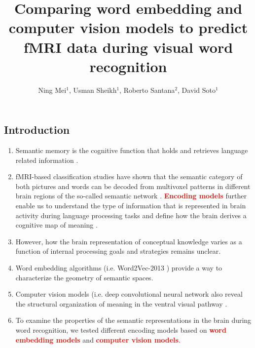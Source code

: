 \documentclass{sciposter}
\title{\myfont Comparing word embedding and computer vision models to predict fMRI data during visual word recognition}
\author{Ning Mei$^1$, Usman Sheikh$^1$, Roberto Santana$^2$, David Soto$^1$}
\institute{1. Basque Center on Cognition, Brain, and Language, San Sebastian, Spain\\ 2. University of Basque Country, Spain}
\begin{document}

\maketitle

\newcommand{\mycaption}{%
\ifx \@captype \@undefined \@latex@error {\noexpand \caption outside float}\@ehd \expandafter \@gobble \else \refstepcounter \@captype \expandafter \@firstofone \fi {\@dblarg {\@caption \@captype }}%
}%

\begin{multicols}{3}


\section{Introduction}

\begin{enumerate}
    \large
    \item Semantic memory is the cognitive function that holds and retrieves language related information \cite{binder2009a}.
    \item fMRI-based classification studies \cite{bauerneural} have shown that the semantic category of both pictures and words can be decoded from multivoxel patterns in different brain regions of the so-called semantic network \cite{binder2009a}. \textcolor{red}{\textbf{Encoding models}} further enable us to understand the type of information that is represented in brain activity during language processing tasks and define how the brain derives a cognitive map of meaning \cite{naselaris2011a,felsen2006a}.
    \item However, how the brain representation of conceptual knowledge varies as a function of internal processing goals and strategies remains unclear.
    \item Word embedding algorithms (i.e. Word2Vec-2013 \cite{mikolov2013a}) provide a way to characterize the geometry of semantic spaces. 
    \item Computer vision models (i.e. deep convolutional neural network \cite{lecun1998gradient} also reveal the structural organization of meaning in the ventral visual pathway \cite{simonyan2014very}.
    \item To examine the properties of the semantic representations in the brain during word recognition, we tested different encoding models based on \textcolor{red}{\textbf{word embedding models}} and \textcolor{red}{\textbf{computer vision models}}.
\end{enumerate}


\end{multicols}
\end{document}
